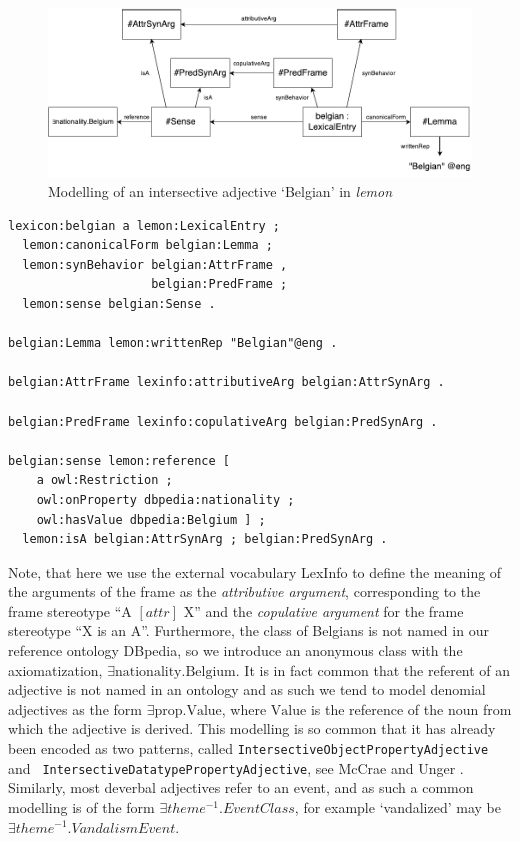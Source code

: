 \documentclass[11pt]{article}
\begin{document}
\begin{figure}
\includegraphics[width=\textwidth]{belgian-example}
\caption{Modelling of an intersective adjective `Belgian' in \emph{lemon}\label{example-belgian}}
\end{figure}

\begin{verbatim}
lexicon:belgian a lemon:LexicalEntry ;
  lemon:canonicalForm belgian:Lemma ;
  lemon:synBehavior belgian:AttrFrame , 
                    belgian:PredFrame ;
  lemon:sense belgian:Sense .

belgian:Lemma lemon:writtenRep "Belgian"@eng .

belgian:AttrFrame lexinfo:attributiveArg belgian:AttrSynArg .

belgian:PredFrame lexinfo:copulativeArg belgian:PredSynArg .

belgian:sense lemon:reference [
    a owl:Restriction ;
    owl:onProperty dbpedia:nationality ;
    owl:hasValue dbpedia:Belgium ] ;
  lemon:isA belgian:AttrSynArg ; belgian:PredSynArg .
\end{verbatim}

Note, that here we use the external vocabulary LexInfo\cite{cimiano2011lexinfo} 
to define the meaning of the arguments of the frame as the \emph{attributive 
argument}, corresponding to the frame stereotype ``A $[attr]$ X'' and the 
\emph{copulative argument} for the frame stereotype ``X is an A''. Furthermore,
the class of Belgians is not named in our reference ontology DBpedia, so we 
introduce an anonymous class with the axiomatization, 
$\exists \text{nationality}.\text{Belgium}$. It is in fact common that the 
referent of an adjective is not named in an ontology and as such we tend to 
model denomial adjectives as the form $\exists \text{prop}.\text{Value}$, 
where $\text{Value}$ is the reference of the noun from which the adjective is
derived. This modelling is so common that it has already been encoded as two
patterns, called {\tt IntersectiveObjectPropertyAdjective} and {\tt
IntersectiveDatatypePropertyAdjective}, see McCrae and Unger .
Similarly, most deverbal adjectives refer to an event, and as such
a common modelling is of the form $\exists theme^{-1}.EventClass$, for example 
`vandalized' may be $\exists theme^{-1}.VandalismEvent$.
\end{document}
